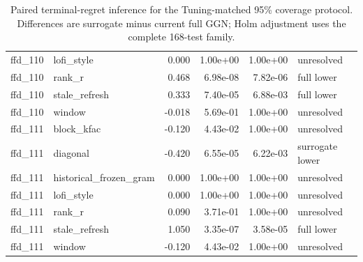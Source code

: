 \begin{table}[p]
\begin{tabular}{llrrrl}
ffd\_110 & lofi\_style & 0.000 & 1.00e+00 & 1.00e+00 & unresolved \\
ffd\_110 & rank\_r & 0.468 & 6.98e-08 & 7.82e-06 & full lower \\
ffd\_110 & stale\_refresh & 0.333 & 7.40e-05 & 6.88e-03 & full lower \\
ffd\_110 & window & -0.018 & 5.69e-01 & 1.00e+00 & unresolved \\
ffd\_111 & block\_kfac & -0.120 & 4.43e-02 & 1.00e+00 & unresolved \\
ffd\_111 & diagonal & -0.420 & 6.55e-05 & 6.22e-03 & surrogate lower \\
ffd\_111 & historical\_frozen\_gram & 0.000 & 1.00e+00 & 1.00e+00 & unresolved \\
ffd\_111 & lofi\_style & 0.000 & 1.00e+00 & 1.00e+00 & unresolved \\
ffd\_111 & rank\_r & 0.090 & 3.71e-01 & 1.00e+00 & unresolved \\
ffd\_111 & stale\_refresh & 1.050 & 3.35e-07 & 3.58e-05 & full lower \\
ffd\_111 & window & -0.120 & 4.43e-02 & 1.00e+00 & unresolved \\
\bottomrule
\end{tabular}
\caption{Paired terminal-regret inference for the Tuning-matched 95\% coverage protocol. Differences are surrogate minus current full GGN; Holm adjustment uses the complete 168-test family.}
\label{tab:coverage-matched-comparisons-2}
\end{table}

